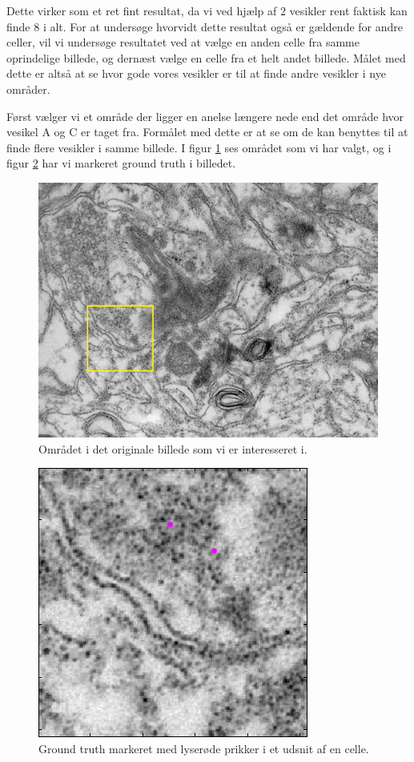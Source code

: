 Dette virker som et ret fint resultat, da vi ved hjælp af 2 vesikler rent faktisk kan finde 8 i alt. For at undersøge hvorvidt dette resultat også er gældende for andre celler, vil vi undersøge resultatet ved at vælge en anden celle fra samme oprindelige billede, og dernæst vælge en celle fra et helt andet billede. Målet med dette er altså at se hvor gode vores vesikler er til at finde andre vesikler i nye områder.

Først vælger vi et område der ligger en anelse længere nede end det område hvor vesikel A og C er taget fra. Formålet med dette er at se om de kan benyttes til at finde flere vesikler i samme billede. I figur \ref{fig:postmethod_conv_area3} ses området som vi har valgt, og i figur \ref{fig:postmethod_conv_gt3} har vi markeret ground truth i billedet.

\begin{figure}[H]
		\centering
		\includegraphics[scale=0.5]{files/postmethod/img/area_3.png}
	\caption{Området i det originale billede som vi er interesseret i.\label{fig:postmethod_conv_area3}}
\end{figure}

\begin{figure}[H]
		\centering
		\includegraphics[scale=0.65]{files/postmethod/img/ground_truth3.png}
	\caption{Ground truth markeret med lyserøde prikker i et udsnit af en celle.\label{fig:postmethod_conv_gt3}}
\end{figure}

